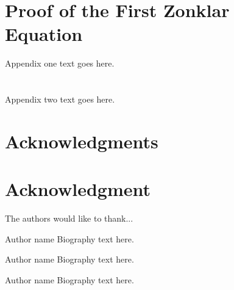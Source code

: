 \documentclass[10pt,journal,compsoc]{IEEEtran}
\begin{document}
\appendices
\section{Proof of the First Zonklar Equation}
Appendix one text goes here.

\section{}
Appendix two text goes here.

\ifCLASSOPTIONcompsoc
  \section*{Acknowledgments}
\else
  \section*{Acknowledgment}
\fi


The authors would like to thank...

\ifCLASSOPTIONcaptionsoff
  \newpage
\fi




\begin{IEEEbiography}{Author name}
Biography text here.
\end{IEEEbiography}

\begin{IEEEbiographynophoto}{Author name}
Biography text here.
\end{IEEEbiographynophoto}

\begin{IEEEbiographynophoto}{Author name}
Biography text here.
\end{IEEEbiographynophoto}

\end{document}
